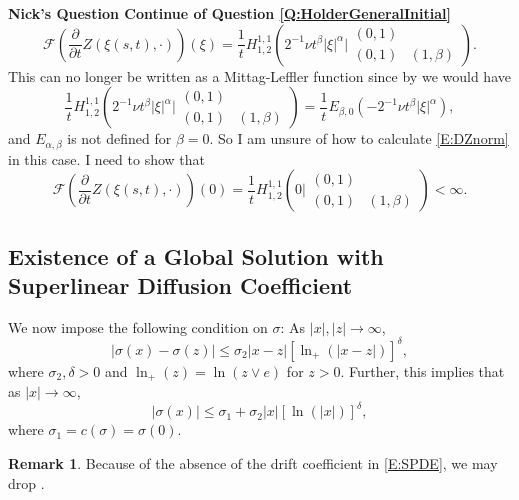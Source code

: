 \documentclass[a4paper,11pt]{article}
\numberwithin{equation}{section}
\theoremstyle{plain}
\theoremstyle{definition}
\newtheorem{remark}[theorem]{Remark}
\newcounter{NQ}
\newenvironment{NickQuestion}[1][] %
{\refstepcounter{NQ}
	\begin{mdframed}[backgroundcolor=lightgray]\textbf{Nick's Question \theNQ \: #1~~}~~~\noindent}%
	{\end{mdframed}}
\numberwithin{NQ}{section}
\numberwithin{LQ}{section}
\numberwithin{ZQ}{section}
\begin{document}
\begin{NickQuestion}[Continue of Question \ref{Q:HolderGeneralInitial}]
	\[
		\mathcal{F} \left( \frac{\partial}{\partial t} Z(\xi(s,t),\cdot) \right)(\xi) = 
			\frac{1}{t} H_{1,2}^{1,1}\left( 2^{-1} \nu t^\beta |\xi|^{\alpha} \bigg\vert \begin{matrix} (0,1) & 
		\\ (0,1) & (1, \beta) \end{matrix} \right).
	\]
This can no longer be written as a Mittag-Leffler function since by \cite[(A.19)]{CHHH16} we would have 
	\[
		\frac{1}{t} H_{1,2}^{1,1}\left( 2^{-1} \nu t^\beta |\xi|^{\alpha} \bigg\vert \begin{matrix} (0,1) & 
		\\ (0,1) & (1, \beta) \end{matrix} \right) = \frac{1}{t} E_{\beta,0}\left( - 2^{-1} \nu t^\beta |\xi|^{\alpha} \right),
	\]
and $E_{\alpha, \beta}$ is not defined for $\beta = 0$. So I am unsure of how to calculate \eqref{E:DZnorm} in this case. I need to show that 
	\[
		\mathcal{F} \left( \frac{\partial}{\partial t} Z(\xi(s,t),\cdot) \right)(0) = 
		\frac{1}{t} H_{1,2}^{1,1}\left( 0 \bigg\vert \begin{matrix} (0,1) & 
		\\ (0,1) & (1, \beta) \end{matrix} \right) < \infty.
	\]
	\end{NickQuestion}
	
	\subsection{Existence of a Global Solution with Superlinear Diffusion Coefficient}
	
	We now impose the following condition on $\sigma$: As $|x|,|z| \to \infty$,
	\begin{equation}
	\label{C:SigSupLin}
	|\sigma(x)-\sigma(z)| \le \sigma_2|x-z|[\ln_+(|x-z|)]^{\delta},
	\end{equation}
	where $\sigma_2 , \delta >0$ and $\ln_+(z) = \ln(z \vee e)$ for $z >0$. Further, this implies that as $|x| \to \infty$,
	\begin{equation}
	|\sigma(x)| \le \sigma_1 + \sigma_2|x|[\ln(|x|)]^{\delta},
	\end{equation}
	where $\sigma_1 = c(\sigma) = \sigma(0)$.
	
	\begin{remark}
		Because of the absence of the drift coefficient in \eqref{E:SPDE}, we may drop \cite[Assumption C1]{SoleMillet2021}.
	\end{remark}
	
\end{document}
